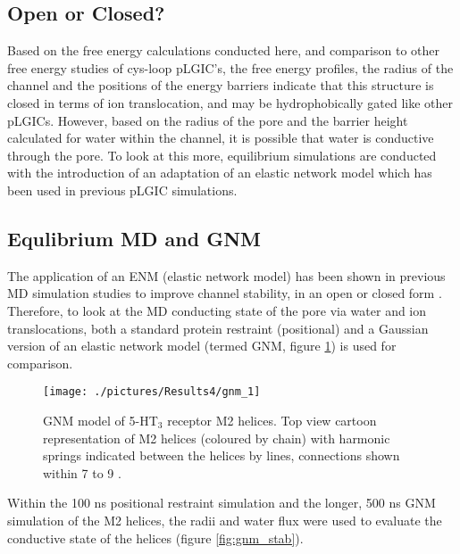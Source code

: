 \subsection*{Open or Closed?}

Based on the free energy calculations conducted here, and comparison to other free energy studies of cys-loop pLGIC's, the free energy profiles, the radius of the channel and the positions of the energy barriers  indicate that this structure is closed in terms of ion translocation, and may be hydrophobically gated like other pLGICs. However, based on the radius of the pore and the barrier height calculated for water within the channel, it is possible that water is conductive through the pore. To look at this more, equilibrium simulations are conducted with the introduction of an adaptation of an elastic network model which has been used in previous pLGIC simulations. 

\subsection{Equlibrium MD and GNM}
 
The application of an ENM (elastic network model) has been shown in previous MD simulation studies to improve channel stability, in an open or closed form \cite{Cheng2012,Haddadian2008}. Therefore, to look at the MD conducting state of the pore via water and ion translocations, both a standard protein restraint (positional) and a Gaussian version of an elastic network model (termed GNM, figure \ref{fig:gnm_1}) is used for comparison.

\begin{figure}[H]
\begin{center}
\texttt{[image: ./pictures/Results4/gnm\_1]}
\caption[GNM model of 5-HT$_3$ receptor M2 helices.] {GNM model of 5-HT$_3$ receptor M2 helices. Top view cartoon representation of M2 helices (coloured by chain) with harmonic springs indicated  between the helices by lines, connections shown within 7 to 9 \angstrom.}
\label{fig:gnm_1}
\end{center}
\end{figure}

Within the 100 ns positional restraint simulation and the longer, 500 ns GNM simulation of the M2 helices, the radii and water flux were used to evaluate the conductive state of the helices (figure \ref{fig:gnm_stab}).


